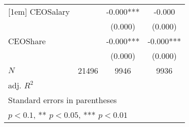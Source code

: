 \begin{table}[htbp]
\begin{tabular}{l*{3}{c}}
[1em]
CEOSalary   &               &      -0.000***&      -0.000   \\
            &               &     (0.000)   &     (0.000)   \\
[1em]
CEOShare    &               &      -0.000***&      -0.000***\\
            &               &     (0.000)   &     (0.000)   \\
\hline
\(N\)       &       21496   &        9946   &        9936   \\
adj. \(R^{2}\)&               &               &               \\
\hline\hline
\multicolumn{4}{l}{\footnotesize Standard errors in parentheses}\\
\multicolumn{4}{l}{\footnotesize * \(p<0.1\), ** \(p<0.05\), *** \(p<0.01\)}\\
\end{tabular}
\end{table}
